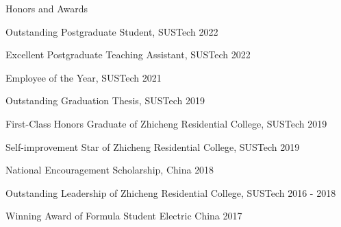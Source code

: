 \documentclass{resume} %
\begin{document}

\begin{rSection}{Honors and Awards}
     \vspace{-8pt}
    \item {Outstanding Postgraduate Student, SUSTech}   \hfill {2022}  
     \vspace{-5pt}
    \item {Excellent Postgraduate Teaching Assistant, SUSTech}   \hfill {2022}  
     \vspace{-5pt}
    \item {Employee of the Year, SUSTech}   \hfill {2021}  
     \vspace{-5pt}
    \item {Outstanding Graduation Thesis, SUSTech}        \hfill {2019}
     \vspace{-5pt}
    \item {First-Class Honors Graduate of Zhicheng Residential College, SUSTech}   \hfill {2019}
     \vspace{-5pt}
    \item {Self-improvement Star of Zhicheng Residential College, SUSTech}   \hfill {2019}
     \vspace{-5pt}
    \item {National Encouragement Scholarship, China}        \hfill {2018}
     \vspace{-5pt}
    \item {Outstanding Leadership of Zhicheng Residential College, SUSTech} \hfill {2016 - 2018}
    \vspace{-5pt}  
     \item {Winning Award of Formula Student Electric China} \hfill {2017}
    \vspace{-5pt}

     


    \end{rSection}
\end{document}
